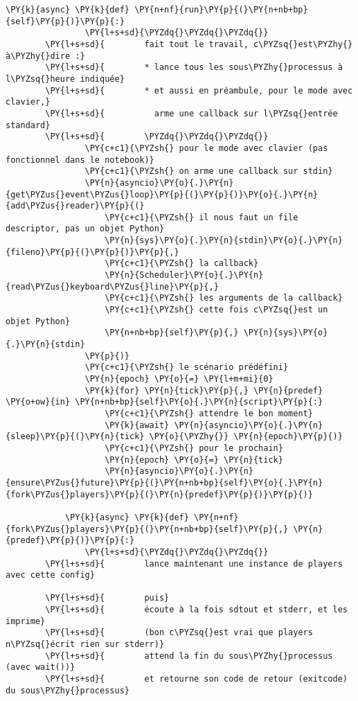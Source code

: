 \begin{Verbatim}[commandchars=\\\{\}]
            \PY{k}{async} \PY{k}{def} \PY{n+nf}{run}\PY{p}{(}\PY{n+nb+bp}{self}\PY{p}{)}\PY{p}{:}
                \PY{l+s+sd}{\PYZdq{}\PYZdq{}\PYZdq{}}
        \PY{l+s+sd}{        fait tout le travail, c\PYZsq{}est\PYZhy{}à\PYZhy{}dire :}
        \PY{l+s+sd}{        * lance tous les sous\PYZhy{}processus à l\PYZsq{}heure indiquée}
        \PY{l+s+sd}{        * et aussi en préambule, pour le mode avec clavier,}
        \PY{l+s+sd}{          arme une callback sur l\PYZsq{}entrée standard}
        \PY{l+s+sd}{        \PYZdq{}\PYZdq{}\PYZdq{}}
                \PY{c+c1}{\PYZsh{} pour le mode avec clavier (pas fonctionnel dans le notebook)}
                \PY{c+c1}{\PYZsh{} on arme une callback sur stdin}
                \PY{n}{asyncio}\PY{o}{.}\PY{n}{get\PYZus{}event\PYZus{}loop}\PY{p}{(}\PY{p}{)}\PY{o}{.}\PY{n}{add\PYZus{}reader}\PY{p}{(}
                    \PY{c+c1}{\PYZsh{} il nous faut un file descriptor, pas un objet Python}
                    \PY{n}{sys}\PY{o}{.}\PY{n}{stdin}\PY{o}{.}\PY{n}{fileno}\PY{p}{(}\PY{p}{)}\PY{p}{,}
                    \PY{c+c1}{\PYZsh{} la callback}
                    \PY{n}{Scheduler}\PY{o}{.}\PY{n}{read\PYZus{}keyboard\PYZus{}line}\PY{p}{,}
                    \PY{c+c1}{\PYZsh{} les arguments de la callback}
                    \PY{c+c1}{\PYZsh{} cette fois c\PYZsq{}est un objet Python}
                    \PY{n+nb+bp}{self}\PY{p}{,} \PY{n}{sys}\PY{o}{.}\PY{n}{stdin}
                \PY{p}{)}
                \PY{c+c1}{\PYZsh{} le scénario prédéfini}
                \PY{n}{epoch} \PY{o}{=} \PY{l+m+mi}{0}
                \PY{k}{for} \PY{n}{tick}\PY{p}{,} \PY{n}{predef} \PY{o+ow}{in} \PY{n+nb+bp}{self}\PY{o}{.}\PY{n}{script}\PY{p}{:}
                    \PY{c+c1}{\PYZsh{} attendre le bon moment}
                    \PY{k}{await} \PY{n}{asyncio}\PY{o}{.}\PY{n}{sleep}\PY{p}{(}\PY{n}{tick} \PY{o}{\PYZhy{}} \PY{n}{epoch}\PY{p}{)}
                    \PY{c+c1}{\PYZsh{} pour le prochain}
                    \PY{n}{epoch} \PY{o}{=} \PY{n}{tick}
                    \PY{n}{asyncio}\PY{o}{.}\PY{n}{ensure\PYZus{}future}\PY{p}{(}\PY{n+nb+bp}{self}\PY{o}{.}\PY{n}{fork\PYZus{}players}\PY{p}{(}\PY{n}{predef}\PY{p}{)}\PY{p}{)}
        
            \PY{k}{async} \PY{k}{def} \PY{n+nf}{fork\PYZus{}players}\PY{p}{(}\PY{n+nb+bp}{self}\PY{p}{,} \PY{n}{predef}\PY{p}{)}\PY{p}{:}
                \PY{l+s+sd}{\PYZdq{}\PYZdq{}\PYZdq{}}
        \PY{l+s+sd}{        lance maintenant une instance de players avec cette config}
        
        \PY{l+s+sd}{        puis}
        \PY{l+s+sd}{        écoute à la fois sdtout et stderr, et les imprime}
        \PY{l+s+sd}{        (bon c\PYZsq{}est vrai que players n\PYZsq{}écrit rien sur stderr)}
        \PY{l+s+sd}{        attend la fin du sous\PYZhy{}processus (avec wait())}
        \PY{l+s+sd}{        et retourne son code de retour (exitcode) du sous\PYZhy{}processus}
        

\end{Verbatim}
